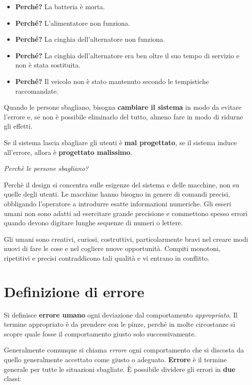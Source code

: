\begin{itemize}
	\itemsep-0.3em
	\item \textbf{Perché?} La batteria è morta.
	\item \textbf{Perché?} L'alimentatore non funziona.
	\item \textbf{Perché?} La cinghia dell'alternatore non funziona.
	\item \textbf{Perché?} La cinghia dell'alternatore era ben oltre il suo tempo di servizio e non è stata sostituita.
	\item \textbf{Perché?} Il veicolo non è stato mantenuto secondo le tempistiche raccomandate.
\end{itemize}

Quando le persone sbagliano, bisogna \textbf{cambiare il sistema} in modo da evitare l'errore
e, se non è possibile eliminarlo del tutto, almeno fare in modo di ridurne gli effetti.

Se il sistema lascia sbagliare gli utenti è \textbf{mal progettato}, se il sistema induce all'errore, allora è \textbf{progettato malissimo}.

\vspace{\baselineskip}
\textit{Perchè le persone sbagliano?}
\vspace{\baselineskip}

Perchè il design si concentra sulle esigenze del sistema e delle macchine, non su quelle degli utenti. Le macchine hanno bisogno in genere di
comandi precisi, obbligando l'operatore a introdurre esatte informazioni numeriche. Gli esseri umani non sono adatti ad esercitare grande precisione
e commettono spesso errori quando devono digitare lunghe sequenze di numeri o lettere.

Gli umani sono creativi, curiosi, costruttivi, particolarmente bravi nel creare modi nuovi di fare le cose e nel cogliere nuove opportunità. Compiti
monotoni, ripetitivi e precisi contraddicono tali qualità e vi entrano in conflitto.

\section{Definizione di errore}
Si definisce \textbf{errore umano} ogni deviazione dal comportamento \textit{appropriato}. Il termine appropriato è da prendere con le pinze, perché
in molte circostanze si scopre quale fosse il comportamento giusto solo successivamente.

Generalmente comunque si chiama \textit{errore} ogni comportamento che si discosta da quello generalmente accettato come giusto o adeguato.
\textbf{Errore} è il termine generale per tutte le situazioni sbagliate. È possibile dividere gli errori in \textbf{due} classi:

